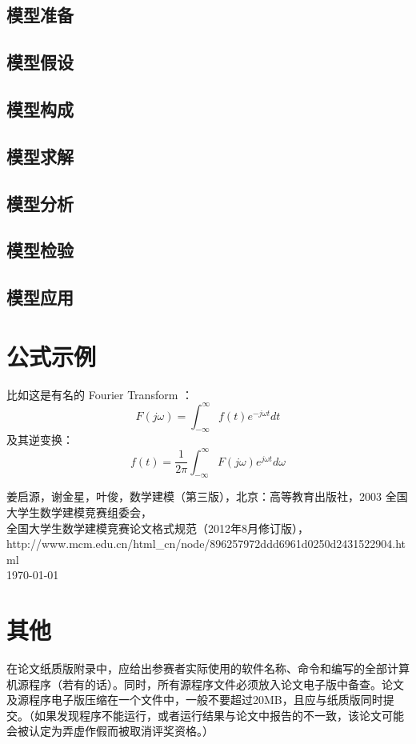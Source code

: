 \documentclass[10pt,a4paper]{article}
\begin{document}
\begin{CJK}{UTF8}{gbsn}
\subsection{模型准备}
\subsection{模型假设}
\subsection{模型构成}
\subsection{模型求解}
\subsection{模型分析}
\subsection{模型检验}
\subsection{模型应用}

\section{公式示例}
比如这是有名的 Fourier Transform ：
\begin{equation}
	F(j\omega) = \int_{-\infty}^{\infty} f(t) e^{-j\omega t} dt
\end{equation}
及其逆变换：
\begin{equation}
	f(t) = \frac{1}{2\pi} \int_{-\infty}^{\infty} F(j\omega) e^{j\omega t} d\omega
\end{equation}

\newpage
\appendix
\begin{thebibliography}{10}
	 姜启源，谢金星，叶俊，数学建模（第三版），北京：高等教育出版社，2003
	 全国大学生数学建模竞赛组委会，\\
		全国大学生数学建模竞赛论文格式规范（2012年8月修订版），\\
		http://www.mcm.edu.cn/html\_cn/node/896257972ddd6961d0250d2431522904.html\\
		\today
\end{thebibliography}

\section{其他}
在论文纸质版附录中，应给出参赛者实际使用的软件名称、命令和编写的全部计算机源程序（若有的话）。同时，所有源程序文件必须放入论文电子版中备查。论文及源程序电子版压缩在一个文件中，一般不要超过20MB，且应与纸质版同时提交。（如果发现程序不能运行，或者运行结果与论文中报告的不一致，该论文可能会被认定为弄虚作假而被取消评奖资格。）

\end{CJK}
\end{document}
